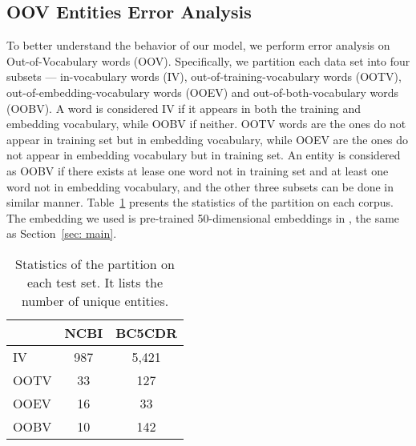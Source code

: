 \subsection{OOV Entities Error Analysis}
To better understand the behavior of our model, we perform error analysis on Out-of-Vocabulary words (OOV). Specifically, we partition each data set into four subsets — in-vocabulary words (IV), out-of-training-vocabulary words (OOTV), out-of-embedding-vocabulary words (OOEV) and
out-of-both-vocabulary words (OOBV). A word is considered IV if it appears in both the training
and embedding vocabulary, while OOBV if neither. OOTV words are the ones do not appear in
training set but in embedding vocabulary, while
OOEV are the ones do not appear in embedding vocabulary but in training set. 
An entity is considered as OOBV if there exists at lease
one word not in training set and at least one word
not in embedding vocabulary, and the other three
subsets can be done in similar manner. Table~\ref{tab: oov_stat} presents the statistics of the partition on each corpus.
The embedding we used is  pre-trained 50-dimensional embeddings in \cite{Pyysalo2013b}, the same as Section~\ref{sec: main}.
\begin{table}[h]
	\small
	\centering
	\begin{tabular}{l|c|c}
		\hline
		&\textbf{NCBI}&\textbf{BC5CDR}\\	
		\hline
		IV&987&5,421\\
		OOTV &33&127\\
		OOEV &16&33\\
		OOBV &10&142\\
		\hline
	\end{tabular}
	\vspace{-0.1in}
	\caption{Statistics of the partition on each test set.
		It lists the number of unique entities.}\label{tab: oov_stat}	
	\vspace{-0.2in}
\end{table}


